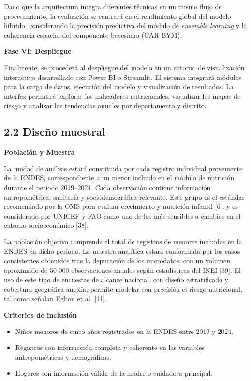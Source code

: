 \documentclass[
]{report}
\begin{document}
Dado que la arquitectura integra diferentes técnicas en un mismo flujo
de procesamiento, la evaluación se centrará en el rendimiento global del
modelo híbrido, considerando la precisión predictiva del módulo de
\emph{ensemble learning} y la coherencia espacial del componente
bayesiano (CAR-BYM).

\textbf{Fase VI: Despliegue}

Finalmente, se procederá al despliegue del modelo en un entorno de
visualización interactivo desarrollado con Power BI o Streamlit. El
sistema integrará módulos para la carga de datos, ejecución del modelo y
visualización de resultados. La interfaz permitirá explorar los
indicadores nutricionales, visualizar los mapas de riesgo y analizar las
tendencias anuales por departamento y distrito.

\hypertarget{diseuxf1o-muestral}{%
\subsection{2.2 Diseño muestral}\label{diseuxf1o-muestral}}

\textbf{Población y Muestra}

La unidad de análisis estará constituida por cada registro individual
proveniente de la ENDES, correspondiente a un menor incluido en el
módulo de nutrición durante el periodo 2019--2024. Cada observación
contiene información antropométrica, sanitaria y sociodemográfica
relevante. Este grupo es el estándar recomendado por la OMS para evaluar
crecimiento y nutrición infantil {[}6{]}, y es considerado por UNICEF y
FAO como uno de los más sensibles a cambios en el entorno socioeconómico
{[}38{]}.

La población objetivo comprende el total de registros de menores
incluidos en la ENDES en dicho periodo. La muestra analítica estará
conformada por los casos consistentes obtenidos tras la depuración de
los microdatos, con un volumen aproximado de 50 000 observaciones
anuales según estadísticas del INEI {[}39{]}. El uso de este tipo de
encuestas de alcance nacional, con diseño estratificado y cobertura
geográfica amplia, permite modelar con precisión el riesgo nutricional,
tal como señalan Egbon et al. {[}11{]}.

\textbf{Criterios de inclusión}

\begin{itemize}
\item
  Niños menores de cinco años registrados en la ENDES entre 2019 y 2024.
\item
  Registros con información completa y coherente en las variables
  antropométricas y demográficas.
\item
  Hogares con información válida de la madre o cuidadora principal.
\end{itemize}
\end{document}
